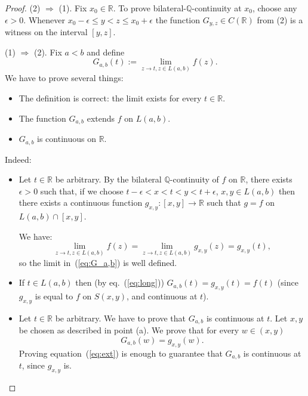 \documentclass[11pt]{amsart} %
\theoremstyle{definition}
\newcommand{\R}{\mathbb{R}}
\newcommand{\Q}{\mathbb{Q}}
\begin{document}
\begin{proof}
(2) $\Rightarrow$ (1). Fix $x_{0}\in\mathbb{R}$. To prove bilateral-$\mathbb{Q}$-continuity at $x_{0}$, choose any
$\epsilon>0$. Whenever $x_{0}-\epsilon\le y<z\le x_{0}+\epsilon$ the function $G_{y,z}\in C(\mathbb{R})$ from (2) is a
witness on the interval $[y, z]$.

(1) $\Rightarrow$ (2). Fix $a<b$ and %
define
\begin{equation} 
G_{a,b}(t):=\lim_{z\rightarrow t,z\in L(a,b)}f(z). 
\label{eq:G_a,b}
\end{equation}
We have to prove several things: 
\begin{itemize} 
\item[(a). ] The definition is correct: the limit exists for every $t\in \R$. 
\item[(b). ] The function $G_{a,b}$ extends $f$ on $L(a,b)$. 
\item[(c). ] $G_{a,b}$ is continuous on $\R$.  
\end{itemize} 

Indeed: 
\begin{itemize} 
\item[(a). ] Let $t\in \R$ be arbitrary. By the bilateral $\Q$-continuity of $f$ on $\R$, there exists $\epsilon > 0$ such that, if we choose $t-\epsilon < x<t<y<t+\epsilon$, $x,y\in L(a,b)$ then there exists a continuous function $g_{x,y}:[x,y]\rightarrow \R$ such that $g=f$ on $L(a,b)\cap [x,y]$. 

We have: 
\begin{equation} 
\lim_{z\rightarrow t,z\in L(a,b)}f(z)=\lim_{z\rightarrow t,z\in L(a,b)}g_{x,y}(z)=g_{x,y}(t),
\label{eq:long} 
\end{equation} 
so the limit in~(\ref{eq:G_a,b}) is well defined. 

\item[(b). ] If $t\in L(a,b)$ then (by eq.~(\ref{eq:long})) $G_{a,b}(t)=g_{x,y}(t)=f(t)$ (since $g_{x,y}$ is equal to $f$ on $S(x,y)$, and continuous at $t$). 

\item[(c). ] Let $t\in \R$ be arbitrary. We have to prove that $G_{a,b}$ is continuous at $t$. Let $x,y$ be chosen as described in point (a). We prove that for every $w\in (x,y)$ 
\begin{equation} 
G_{a,b}(w)=g_{x,y}(w). 
\label{eq:ext} 
\end{equation} 
Proving equation~(\ref{eq:ext}) is enough to guarantee that $G_{a,b}$ is continuous at $t$, since $g_{x,y}$ is. 


\end{itemize}
\end{proof}
\end{document}
